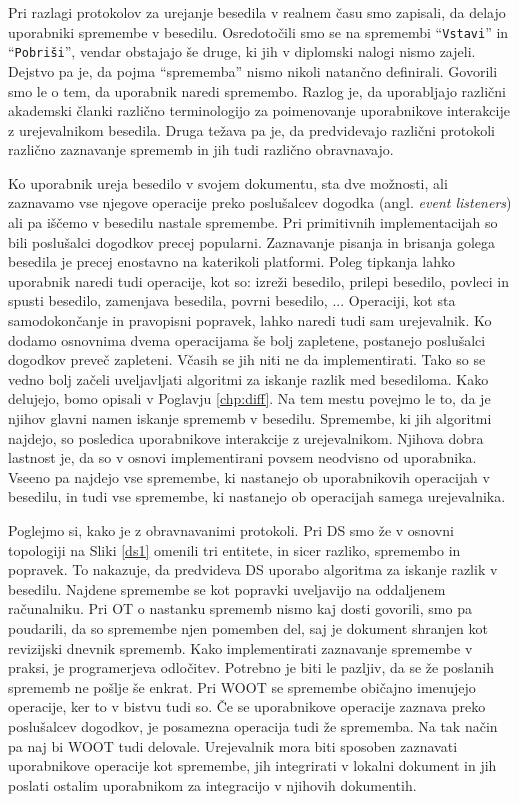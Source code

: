 \documentclass[a4paper, 12pt, twoside]{book}
\begin{document}
Pri razlagi protokolov za urejanje besedila v realnem času smo zapisali, da delajo uporabniki spremembe v besedilu. Osredotočili smo se na spremembi “{\tt Vstavi}” in “{\tt Pobriši}”, vendar obstajajo še druge, ki jih v diplomski nalogi nismo zajeli. Dejstvo pa je, da pojma “sprememba” nismo nikoli natančno definirali. Govorili smo le o tem, da uporabnik naredi spremembo. Razlog je, da uporabljajo različni akademski članki različno terminologijo za poimenovanje uporabnikove interakcije z urejevalnikom besedila. Druga težava pa je, da predvidevajo različni protokoli različno zaznavanje sprememb in jih tudi različno obravnavajo.

Ko uporabnik ureja besedilo v svojem dokumentu, sta dve možnosti, ali zaznavamo vse njegove operacije preko poslušalcev dogodka (angl. \textit{event listeners}) ali pa iščemo v besedilu nastale spremembe. Pri primitivnih implementacijah so bili poslušalci dogodkov precej popularni. Zaznavanje pisanja in brisanja golega besedila je precej enostavno na katerikoli platformi. Poleg tipkanja lahko uporabnik naredi tudi operacije, kot so: izreži besedilo, prilepi besedilo, povleci in spusti besedilo, zamenjava besedila, povrni besedilo, ... Operaciji, kot sta samodokončanje in pravopisni popravek, lahko naredi tudi sam urejevalnik. Ko dodamo osnovnima dvema operacijama še bolj zapletene, postanejo poslušalci dogodkov preveč zapleteni. Včasih se jih niti ne da implementirati. Tako so se vedno bolj začeli uveljavljati algoritmi za iskanje razlik med besediloma. Kako delujejo, bomo opisali v Poglavju \ref{chp:diff}. Na tem mestu povejmo le to, da je njihov glavni namen iskanje sprememb v besedilu. Spremembe, ki jih algoritmi najdejo, so posledica uporabnikove interakcije z urejevalnikom. Njihova dobra lastnost je, da so v osnovi implementirani povsem neodvisno od uporabnika. Vseeno pa najdejo vse spremembe, ki nastanejo ob uporabnikovih operacijah v besedilu, in tudi vse spremembe, ki nastanejo ob operacijah samega urejevalnika.

Poglejmo si, kako je z obravnavanimi protokoli. Pri DS smo že v osnovni topologiji na Sliki \ref{ds1} omenili tri entitete, in sicer razliko, spremembo in popravek. To nakazuje, da predvideva DS uporabo algoritma za iskanje razlik v besedilu. Najdene spremembe se kot popravki uveljavijo na oddaljenem računalniku. Pri OT o nastanku sprememb nismo kaj dosti govorili, smo pa poudarili, da so spremembe njen pomemben del, saj je dokument shranjen kot revizijski dnevnik sprememb. Kako implementirati zaznavanje spremembe v praksi, je programerjeva odločitev. Potrebno je biti le pazljiv, da se že poslanih sprememb ne pošlje še enkrat. Pri WOOT se spremembe običajno imenujejo operacije, ker to v bistvu tudi so. Če se uporabnikove operacije zaznava preko poslušalcev dogodkov, je posamezna operacija tudi že sprememba. Na tak način pa naj bi WOOT tudi delovale. Urejevalnik mora biti sposoben zaznavati uporabnikove operacije kot spremembe, jih integrirati v lokalni dokument in jih poslati ostalim uporabnikom za integracijo v njihovih dokumentih.
\end{document}
